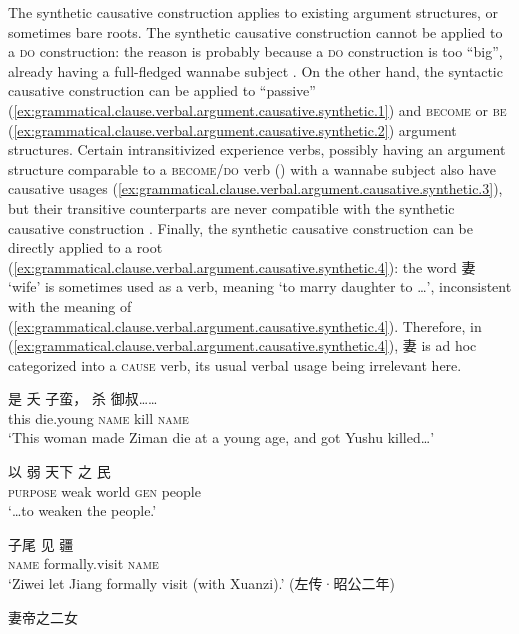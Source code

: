 \documentclass[UTF8, a4paper, oneside, scheme=plain, 12pt]{ctexrep}
\newcommand*{\citepage}[1]{p.~{#1}}
\newcommand{\translate}[1]{`#1'}
\newcommand*{\category}[1]{\textsc{#1}}
\begin{document}
The synthetic causative construction applies to existing argument structures, or sometimes bare roots.
The synthetic causative construction cannot be applied to a \category{do} construction:
the reason is probably because a \category{do} construction is too ``big'',
already having a full-fledged wannabe subject \citep[\citepage{363-364}]{meiguang2018}.
On the other hand, the syntactic causative construction can be applied to 
``passive'' (\ref{ex:grammatical.clause.verbal.argument.causative.synthetic.1})
and \category{become} or \category{be} (\ref{ex:grammatical.clause.verbal.argument.causative.synthetic.2}) argument structures.
Certain intransitivized experience verbs,
possibly having an argument structure comparable to a \category{become}/\category{do} verb () with a wannabe subject also have causative usages
(\ref{ex:grammatical.clause.verbal.argument.causative.synthetic.3}),
but their transitive counterparts are never compatible with the synthetic causative construction
\citep[\citepage{274}]{meiguang2018}.
Finally, the synthetic causative construction can be directly applied to a root (\ref{ex:grammatical.clause.verbal.argument.causative.synthetic.4}):
the word 妻 \translate{wife} is sometimes used as a verb,
meaning \translate{to marry daughter to \dots},
inconsistent with the meaning of (\ref{ex:grammatical.clause.verbal.argument.causative.synthetic.4}).
Therefore, in (\ref{ex:grammatical.clause.verbal.argument.causative.synthetic.4}),
妻 is ad hoc categorized into a \category{cause} verb,
its usual verbal usage being irrelevant here.

\begin{exe}
    \ex\label{ex:grammatical.clause.verbal.argument.causative.synthetic.1}
    \gll 是 夭 子蛮， 杀 御叔…… \\
    this die.young \category{name} kill \category{name} \\
    \glt\translate{This woman made Ziman die at a young age, and got Yushu killed\dots}
    
    \ex\label{ex:grammatical.clause.verbal.argument.causative.synthetic.2}
    \gll 以 弱 天下 之 民 \\
    \category{purpose} weak world \category{gen} people \\
    \glt\translate{\dots to weaken the people.}

    \ex\label{ex:grammatical.clause.verbal.argument.causative.synthetic.3}
    \gll 子尾 见 疆 \\
    \category{name} formally.visit \category{name} \\
    \glt\translate{Ziwei let Jiang formally visit (with Xuanzi).} (左传·昭公二年)

    \ex\label{ex:grammatical.clause.verbal.argument.causative.synthetic.4} 妻帝之二女
\end{exe}
\end{document}
